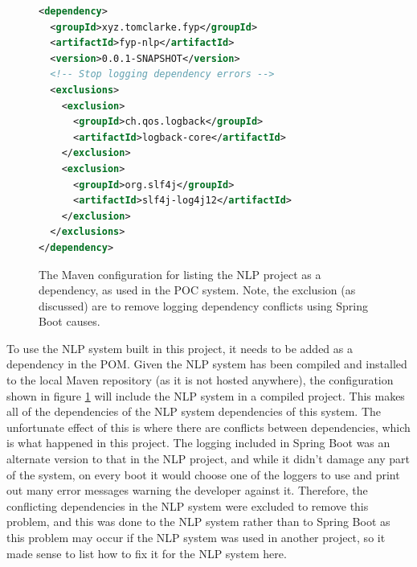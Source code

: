 \begin{figure}
	\begin{lstlisting}[language=XML]
<dependency>
  <groupId>xyz.tomclarke.fyp</groupId>
  <artifactId>fyp-nlp</artifactId>
  <version>0.0.1-SNAPSHOT</version>
  <!-- Stop logging dependency errors -->
  <exclusions>
    <exclusion>
      <groupId>ch.qos.logback</groupId>
      <artifactId>logback-core</artifactId>
    </exclusion>
    <exclusion>
      <groupId>org.slf4j</groupId>
      <artifactId>slf4j-log4j12</artifactId>
    </exclusion>
  </exclusions>
</dependency>
	\end{lstlisting}
	\caption[Configuration to set the NLP system as a dependency in Maven]{The Maven configuration for listing the NLP project as a dependency, as used in the POC system. Note, the exclusion (as discussed) are to remove logging dependency conflicts using Spring Boot causes.}
	\label{figure:nlpdependency}
\end{figure}

To use the NLP system built in this project, it needs to be added as a dependency in the POM. Given the NLP system has been compiled and installed to the local Maven repository (as it is not hosted anywhere), the configuration shown in figure \ref{figure:nlpdependency} will include the NLP system in a compiled project. This makes all of the dependencies of the NLP system dependencies of this system. The unfortunate effect of this is where there are conflicts between dependencies, which is what happened in this project. The logging included in Spring Boot was an alternate version to that in the NLP project, and while it didn't damage any part of the system, on every boot it would choose one of the loggers to use and print out many error messages warning the developer against it. Therefore, the conflicting dependencies in the NLP system were excluded to remove this problem, and this was done to the NLP system rather than to Spring Boot as this problem may occur if the NLP system was used in another project, so it made sense to list how to fix it for the NLP system here. 

